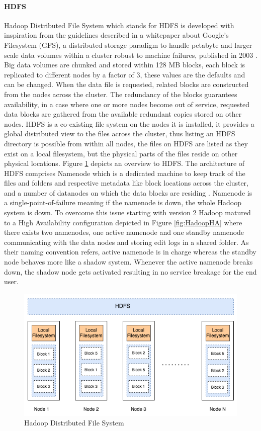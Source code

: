 \documentclass[review]{elsarticle}
\begin{document}
\paragraph{HDFS}Hadoop Distributed File System which stands for HDFS is developed with inspiration from the guidelines described in a whitepaper about Google's Filesystem (GFS), a distributed storage paradigm to handle petabyte and larger scale data volumes within a cluster robust to machine failures, published in 2003 \cite{ghemawat_google_2003}. Big data volumes are chunked and stored within 128 MB blocks, each block is replicated to different nodes by a factor of 3, these values are the defaults and can be changed. When the data file is requested, related blocks are constructed from the nodes across the cluster. The redundancy of the blocks guarantees availability, in a case where one or more nodes become out of service, requested data blocks are gathered from the available redundant copies stored on other nodes. HDFS is a co-existing file system on the nodes it is installed, it provides a global distributed view to the files across the cluster, thus listing an HDFS directory is possible from within all nodes, the files on HDFS are listed as they exist on a local filesystem, but the physical parts of the files reside on other physical locations. Figure \ref{fig:HDFSoverview} depicts an overview to HDFS. The architecture of HDFS comprises Namenode which is a dedicated machine to keep track of the files and folders and respective metadata like block locations across the cluster, and a number of datanodes on which the data blocks are residing \cite{white_hadoop_2015}. Namenode is a single-point-of-failure meaning if the namenode is down, the whole Hadoop system is down. To overcome this issue starting with version 2 Hadoop matured to a High Availability configuration depicted in Figure \ref{fig:HadoopHA} where there exists two namenodes, one active namenode and one standby namenode communicating with the data nodes and storing edit logs in a shared folder. As their naming convention refers, active namenode is in charge whereas the standby node behaves more like a shadow system. Whenever the active namenode breaks down, the shadow node gets activated resulting in no service breakage for the end user.


\begin{figure}[p]
	\includegraphics[width=\textwidth]{HDFSoverview}
	\caption{Hadoop Distributed File System}
	\label{fig:HDFSoverview}
	\centering
\end{figure}
\end{document}
